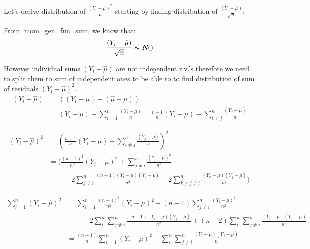 \begin{solution}
Let's derive distribution of $\frac{\left(Y_i - \hat{\mu}\right)^2}{n}$ starting by finding distribution of $\frac{\left(Y_i - \hat{\mu}\right)}{\sqrt{n}}$:

From \eqref{mom_gen_fun_sum} we know that:
\begin{equation}
\frac{\left(Y_i - \hat{\mu}\right)}{\sqrt{n}} \thicksim \textbf{\em N}()
\end{equation}

However individual sums $(Y_i - \hat{\mu})$ are not independent r.v.'s therefore we need to split them to sum of independent ones to be able to to find distribution of sum of residuals $(Y_i - \hat{\mu})^2$.
\begin{equation}
\begin{split}
\left(Y_i - \hat{\mu}\right)  & = \left((Y_i - \mu) - (\hat{\mu} - \mu)\right) \\
														  & = (Y_i - \mu) - \sum_{i=1}^{n}\frac{(Y_i - \mu)}{n} 
														    = \frac{n-1}{n}(Y_i - \mu) - \sum_{i \ne j}^{n}\frac{(Y_j - \mu)}{n}
\end{split}
\end{equation}

\begin{equation}
\begin{aligned}
\left(Y_i - \hat{\mu}\right)^2 & = \left(\frac{n-1}{n}(Y_i - \mu) - \sum_{i \ne j}^{n}\frac{(Y_j - \mu)}{n}\right)^2 \\
															 & = \Bigg(\frac{(n-1)^2}{n^2}(Y_i - \mu)^2  + \sum_{j \ne i}^{n}\frac{(Y_j -\mu)^2}{n^2} \\
															 & \qquad - 2\sum_{j \ne i}^{n}\frac{(n-1)(Y_i -\mu)(Y_j -\mu)}{n^2}
															          + 2\sum_{k \ne j \ne i}^{n}\frac{(Y_k -\mu)(Y_j -\mu)}{n^2}\Bigg)	
\end{aligned}
\end{equation}

\begin{equation}
\begin{aligned}
\sum_{i=1}^n\left(Y_i - \hat{\mu}\right)^2 & = \sum_{i=1}^n\frac{(n-1)^2}{n^2}(Y_i - \mu)^2 + (n-1)\sum_{j \ne i}^{n}\frac{(Y_i - \mu)^2}{n^2} \\
																					 & \qquad - 2\sum_{i}^{n}\sum_{j \ne i}^{n}\frac{(n-1)(Y_i -\mu)(Y_j -\mu)}{n^2} 
																					          + (n-2)\sum_{i}^{n}\sum_{j \ne i}^{n}\frac{(Y_i -\mu)(Y_j -\mu)}{n^2} \\
																					 & = \frac{(n-1)}{n}\sum_{i=1}^n(Y_i - \mu)^2 
																					          - \sum_{i}^{n}\sum_{j \ne i}^{n}\frac{(Y_i -\mu)(Y_j -\mu)}{n} \\
\label{sigma_hat_expansion}																										
\end{aligned}
\end{equation}


\end{solution}
